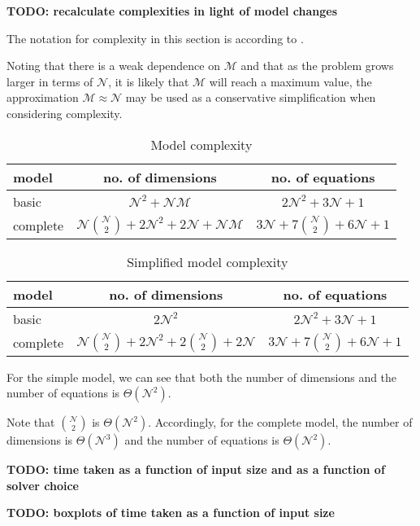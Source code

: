 \textbf{TODO: recalculate complexities in light of model changes}

The notation for complexity in this section is according to \citet{Knuth:1976}.

Noting that there is a weak dependence on $\mathcal{M}$ and that as the problem
grows larger in terms of $\mathcal{N}$, it is likely that $\mathcal{M}$ will
reach a maximum value, the approximation $\mathcal{M} \approx \mathcal{N}$ may
be used as a conservative simplification when considering complexity.
\begin{table}[h!]
    \centering
    \caption{Model complexity}
    \label{tbl.complexity1}
    \begin{tabular}{l | c | c}
        model & no. of dimensions & no. of equations\\ \hline
        basic & $\mathcal{N}^2 + \mathcal{N} \mathcal{M}$
            & $2\mathcal{N}^2 + 3\mathcal{N} + 1$\\
        complete & $\mathcal{N} {{\mathcal{N}}\choose{2}}
            + 2\mathcal{N}^2 + 2\mathcal{N} +\mathcal{N} \mathcal{M}$
            & $3\mathcal{N} + 7{{\mathcal{N}}\choose{2}} + 6\mathcal{N} + 1$\\
    \end{tabular}
\end{table}
\begin{table}[h!]
    \centering
    \caption{Simplified model complexity}
    \label{tbl.complexity2}
    \begin{tabular}{l | c | c}
        model & no. of dimensions & no. of equations\\ \hline
        basic & $2\mathcal{N}^2$ & $2\mathcal{N}^2 + 3\mathcal{N} + 1$\\
        complete & $\mathcal{N} {{\mathcal{N}}\choose{2}}
            + 2\mathcal{N}^2 + 2{{\mathcal{N}}\choose{2}} + 2\mathcal{N}$
            & $3\mathcal{N} + 7{{\mathcal{N}}\choose{2}} + 6\mathcal{N} + 1$\\
    \end{tabular}
\end{table}
For the simple model, we can see that both the number of dimensions and the
number of equations is $\Theta \left( \mathcal{N}^2 \right)$.

Note that ${{\mathcal{N}}\choose{2}}$ is $\Theta \left( \mathcal{N}^2 \right)$.
Accordingly, for the complete model, the number of dimensions is 
$\Theta \left( \mathcal{N}^3 \right)$ and the number of equations is
$\Theta \left( \mathcal{N}^2 \right)$.

\textbf{TODO: time taken as a function of input size and as a function of 
    solver choice}
    
\textbf{TODO: boxplots of time taken as a function of input size}
